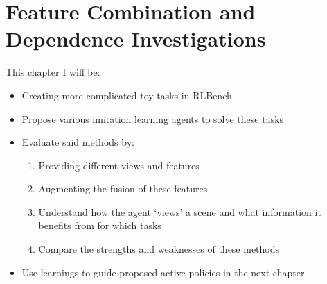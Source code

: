 \chapter{Feature Combination and Dependence Investigations}
This chapter I will be:
\begin{itemize}
  \item Creating more complicated toy tasks in RLBench
  \item Propose various imitation learning agents to solve these tasks
  \item Evaluate said methods by:
  \begin{enumerate}
    \item Providing different views and features
    \item Augmenting the fusion of these features
    \item Understand how the agent `views' a scene and what information it benefits from for which tasks
    \item Compare the strengths and weaknesses of these methods
  \end{enumerate}
  \item Use learnings to guide proposed active policies in the next chapter 
  
\end{itemize}











